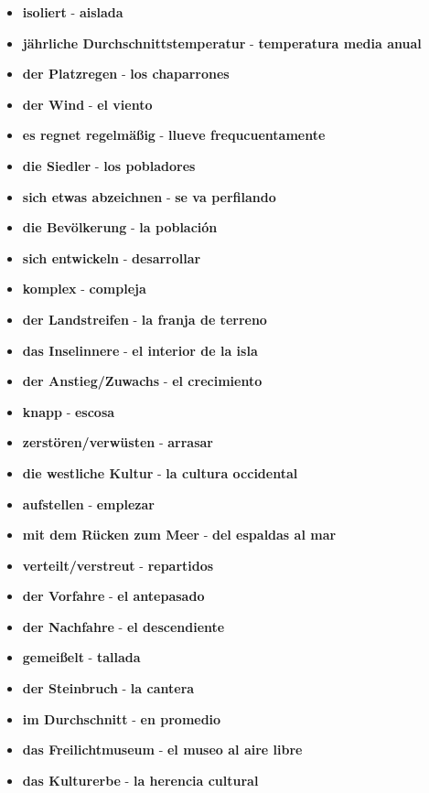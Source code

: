 \documentclass{article}
\begin{document}
\begin{multicols}{2}
\begin{itemize}
		\item{\textbf{isoliert} - \textbf{aislada}}
		\item{\textbf{jährliche Durchschnittstemperatur} - \textbf{temperatura media anual}}
		\item{\textbf{der Platzregen} - \textbf{los chaparrones}}
		\item{\textbf{der Wind} - \textbf{el viento}}
		\item{\textbf{es regnet regelmäßig} - \textbf{llueve frequcuentamente}}
		\item{\textbf{die Siedler} - \textbf{los pobladores}}
		\item{\textbf{sich etwas abzeichnen} - \textbf{se va perfilando}}
		\item{\textbf{die Bevölkerung} - \textbf{la población}}
		\item{\textbf{sich entwickeln} - \textbf{desarrollar}}
		\item{\textbf{komplex} - \textbf{compleja}}
		\item{\textbf{der Landstreifen} - \textbf{la franja de terreno}}
		\item{\textbf{das Inselinnere} - \textbf{el interior de la isla}}
		\item{\textbf{der Anstieg/Zuwachs} - \textbf{el crecimiento}}
		\item{\textbf{knapp} - \textbf{escosa}}
		\item{\textbf{zerstören/verwüsten} - \textbf{arrasar}}
		\item{\textbf{die westliche Kultur} - \textbf{la cultura occidental}}
		\item{\textbf{aufstellen} - \textbf{emplezar}}
		\item{\textbf{mit dem Rücken zum Meer} - \textbf{del espaldas al mar}}
		\item{\textbf{verteilt/verstreut} - \textbf{repartidos}}
		\item{\textbf{der Vorfahre} - \textbf{el antepasado}}
		\item{\textbf{der Nachfahre} - \textbf{el descendiente}}
		\item{\textbf{gemeißelt} - \textbf{tallada}}
		\item{\textbf{der Steinbruch} - \textbf{la cantera}}
		\item{\textbf{im Durchschnitt} - \textbf{en promedio}}
		\item{\textbf{das Freilichtmuseum} - \textbf{el museo al aire libre}}
		\item{\textbf{das Kulturerbe} - \textbf{la herencia cultural}}

\end{itemize}
\end{multicols}
\end{document}
